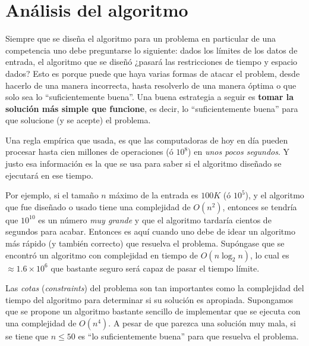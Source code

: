 \section{Análisis del algoritmo}
Siempre que se diseña el algoritmo para un problema en particular de una competencia uno debe
preguntarse lo siguiente: dados los límites de los datos de entrada, el algoritmo que se diseñó
¿pasará las restricciones de tiempo y espacio dados?
Esto es porque puede que haya varias formas de atacar el problem, desde hacerlo de una manera
incorrecta, hasta resolverlo de una manera óptima o que solo sea lo ``suficientemente buena''.
Una buena estrategia a seguir es \textbf{tomar la solución más simple que funcione}, es decir,
lo ``suficientemente buena'' para que solucione (y se acepte) el problema.

Una regla empírica que usada, es que las computadoras de hoy en día pueden procesar hasta cien
millones de operaciones (ó $10^8$) en \textit{unos pocos segundos}. Y justo esa información es la
que se usa para saber si el algoritmo diseñado se ejecutará en ese tiempo.

Por ejemplo, si el tamaño $n$ máximo de la entrada es $100K$ (ó $10^5$), y el algoritmo que fue
diseñado o usado tiene una complejidad de $O(n^2)$, entonces se tendría que $10^{10}$ es un número
\emph{muy grande} y que el algoritmo tardaría cientos de segundos para acabar. Entonces es aquí
cuando uno debe de idear un algoritmo más rápido (y también correcto) que resuelva el problema.
Supóngase que se encontró un algoritmo con complejidad en tiempo de $O(n \log_2 n)$, lo cual
es $\approx 1.6 \times 10^6$ que bastante seguro será capaz de pasar el tiempo límite.

Las \emph{cotas} (\emph{constraints}) del problema son tan importantes como la complejidad del
tiempo del algoritmo para determinar si su solución es apropiada. Supongamos que se propone un
algoritmo bastante sencillo de implementar que se ejecuta con una complejidad de $O(n^4)$. A pesar
de que parezca una solución muy mala, si se tiene que $n \leq 50$ es ``lo suficientemente buena''
para que resuelva el problema.

